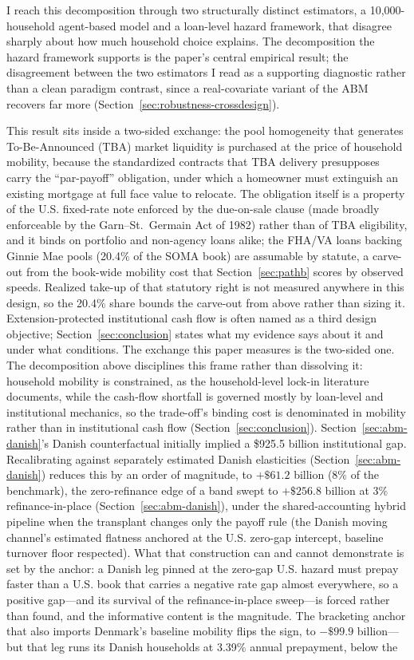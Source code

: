 \documentclass[12pt]{article}
\begin{document}
I reach this decomposition through two structurally distinct estimators, a 10,000-household agent-based model and a loan-level hazard framework, that disagree sharply about how much household choice explains. The decomposition the hazard framework supports is the paper's central empirical result; the disagreement between the two estimators I read as a supporting diagnostic rather than a clean paradigm contrast, since a real-covariate variant of the ABM recovers far more (Section~\ref{sec:robustness-crossdesign}).

This result sits inside a two-sided exchange: the pool homogeneity that generates To-Be-Announced (TBA) market liquidity is purchased at the price of household mobility, because the standardized contracts that TBA delivery presupposes carry the ``par-payoff'' obligation, under which a homeowner must extinguish an existing mortgage at full face value to relocate. The obligation itself is a property of the U.S. fixed-rate note enforced by the due-on-sale clause (made broadly enforceable by the Garn--St.~Germain Act of 1982) rather than of TBA eligibility, and it binds on portfolio and non-agency loans alike; the FHA/VA loans backing Ginnie Mae pools (20.4\% of the SOMA book) are assumable by statute, a carve-out from the book-wide mobility cost that Section~\ref{sec:pathb} scores by observed speeds. Realized take-up of that statutory right is not measured anywhere in this design, so the 20.4\% share bounds the carve-out from above rather than sizing it. Extension-protected institutional cash flow is often named as a third design objective; Section~\ref{sec:conclusion} states what my evidence says about it and under what conditions. The exchange this paper measures is the two-sided one. The decomposition above disciplines this frame rather than dissolving it: household mobility is constrained, as the household-level lock-in literature documents, while the cash-flow shortfall is governed mostly by loan-level and institutional mechanics, so the trade-off's binding cost is denominated in mobility rather than in institutional cash flow (Section~\ref{sec:conclusion}). Section~\ref{sec:abm-danish}'s Danish counterfactual initially implied a \$925.5 billion institutional gap. Recalibrating against separately estimated Danish elasticities (Section~\ref{sec:abm-danish}) reduces this by an order of magnitude, to $+\$61.2$ billion (8\% of the benchmark), the zero-refinance edge of a band swept to $+\$256.8$ billion at 3\% refinance-in-place (Section~\ref{sec:abm-danish}), under the shared-accounting hybrid pipeline when the transplant changes only the payoff rule (the Danish moving channel's estimated flatness anchored at the U.S. zero-gap intercept, baseline turnover floor respected). What that construction can and cannot demonstrate is set by the anchor: a Danish leg pinned at the zero-gap U.S. hazard must prepay faster than a U.S. book that carries a negative rate gap almost everywhere, so a positive gap---and its survival of the refinance-in-place sweep---is forced rather than found, and the informative content is the magnitude. The bracketing anchor that also imports Denmark's baseline mobility flips the sign, to $-\$99.9$ billion---but that leg runs its Danish households at 3.39\% annual prepayment, below the 
\end{document}
